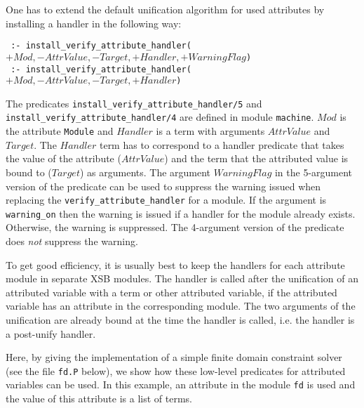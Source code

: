 One has to extend the default unification algorithm for used
attributes by installing a handler in the following way:

\noindent
{\tt
:- install\_verify\_attribute\_handler($+Mod, -AttrValue, -Target, +Handler, +WarningFlag$)}
\\
{\tt
  :- install\_verify\_attribute\_handler($+Mod, -AttrValue, -Target, +Handler$)}

\noindent The
predicates
\texttt{install\_verify\_attribute\_handler/5}
and
\texttt{install\_verify\_attribute\_handler/4}
are defined in module \texttt{machine}. $Mod$ is the
attribute {\tt Module} and $Handler$ is a term with arguments
$AttrValue$ and $Target$. The $Handler$ term has to correspond to a
handler predicate that takes the value of the attribute ($AttrValue$)
and the term that the attributed value is bound to ($Target$) as
arguments. The argument $WarningFlag$ in the 5-argument version of the
predicate can be used to suppress the warning issued when replacing the
{\tt verify\_attribute\_handler} for a module. If the argument is
{\tt warning\_on} then the warning is issued if a handler for the module
already exists. Otherwise, the warning is suppressed. 
The 4-argument version of the predicate does \emph{not} suppress the
warning. 

To get good efficiency, it is usually best to keep the
handlers for each attribute module in separate XSB modules.
The handler is called after the unification of an attributed variable
with a term or other attributed variable, if the attributed variable
has an attribute in the corresponding module. The two arguments of the
unification are already bound at the time the handler is called,
i.e. the handler is a post-unify handler.

Here, by giving the implementation of a simple finite domain
constraint solver (see the file \texttt{fd.P} below), we show how
these low-level predicates for attributed variables can be used.  In
this example, an attribute in the module \texttt{fd} is used and the
value of this attribute is a list of terms.

